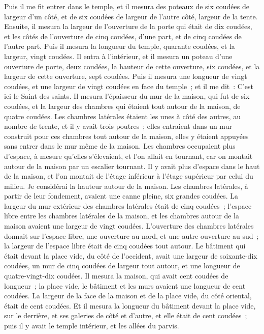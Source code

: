 \begin{multicols}{2}
\VerseOne{}Puis il me fit entrer dans le temple, et il mesura des poteaux de six coudées de largeur d'un côté, et de six coudées de largeur de l'autre côté, largeur de la tente.
Ensuite, il mesura la largeur de l'ouverture de la porte qui était de dix coudées, et les côtés de l'ouverture de cinq coudées, d'une part, et de cinq coudées de l'autre part. Puis il mesura la longueur du temple, quarante coudées, et la largeur, vingt coudées.
Il entra à l'intérieur, et il mesura un poteau d'une ouverture de porte, deux coudées, la hauteur de cette ouverture, six coudées, et la largeur de cette ouverture, sept coudées.
Puis il mesura une longueur de vingt coudées, et une largeur de vingt coudées en face du temple~; et il me dit~: C'est ici le Saint des saints.
Il mesura l'épaisseur du mur de la maison, qui fut de six coudées, et la largeur des chambres qui étaient tout autour de la maison, de quatre coudées.
Les chambres latérales étaient les unes à côté des autres, au nombre de trente, et il y avait trois poutres~; elles entraient dans un mur construit pour ces chambres tout autour de la maison, elles y étaient appuyées sans entrer dans le mur même de la maison.
Les chambres occupaient plus d'espace, à mesure qu'elles s'élevaient, et l'on allait en tournant, car on montait autour de la maison par un escalier tournant. Il y avait plus d'espace dans le haut de la maison, et l'on montait de l'étage inférieur à l'étage supérieur par celui du milieu.
Je considérai la hauteur autour de la maison. Les chambres latérales, à partir de leur fondement, avaient une canne pleine, six grandes coudées.
La largeur du mur extérieur des chambres latérales était de cinq coudées~; l'espace libre entre les chambres latérales de la maison,
et les chambres autour de la maison avaient une largeur de vingt coudées.
L'ouverture des chambres latérales donnait sur l'espace libre, une ouverture au nord, et une autre ouverture au sud~; la largeur de l'espace libre était de cinq coudées tout autour.
Le bâtiment qui était devant la place vide, du côté de l'occident, avait une largeur de soixante-dix coudées, un mur de cinq coudées de largeur tout autour, et une longueur de quatre-vingt-dix coudées.
Il mesura la maison, qui avait cent coudées de longueur~; la place vide, le bâtiment et les murs avaient une longueur de cent coudées.
La largeur de la face de la maison et de la place vide, du côté oriental, était de cent coudées.
Et il mesura la longueur du bâtiment devant la place vide, sur le derrière, et ses galeries de côté et d'autre, et elle était de cent coudées~; puis il y avait le temple intérieur, et les allées du parvis.

\end{multicols}
